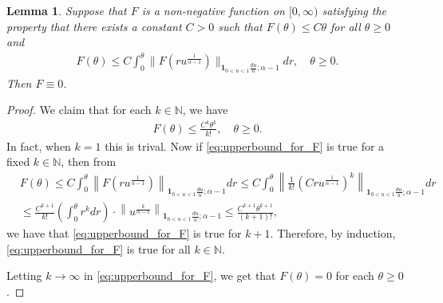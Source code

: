 \documentclass[12pt,a4paper]{amsart}
\newtheorem{lem}[thm]{Lemma}
\theoremstyle{definition}
\numberwithin{equation}{section}
\begin{document}
\begin{comment}
\begin{lem} \label{lem: characterize the general Mittag-Leffler distribution}
  Suppose that $\alpha \in (1,2).$
  The non-linear delay equation
  \begin{align} \label{eq: equation for the distribution}
    G( \theta)
    = \int_0^\theta \exp\Big\{ - \frac{\alpha} {\alpha - 1} \int_0^1 G(ru^{\frac{1}{\alpha - 1} })^{\alpha - 1}\frac{du}{u} \Big\} dr,
    \quad \theta \geq 0,
  \end{align}
	has a unique solution:
  \begin{align}\label{eq: solution for the equation}
    G(\theta)
    = \Big(\frac{1}{1+\theta^{-(\alpha - 1)}}\Big)^{\frac{1}{\alpha - 1}},
    \quad \theta \geq 0.
  \end{align}
\end{lem}
\end{comment}

\begin{lem}\label{lem: F is zero}
	Suppose that $F$ is a non-negative function on $[0,\infty)$ satisfying the property that there exists a constant $C>0$ such that  $F(\theta) \leq C\theta$ for all $\theta \geq 0$ and
  \begin{align}
    \label{eq:Gronwall_inequlity}
    F(\theta)
    \leq C \int_0^\theta \|  F(ru^{ \frac{1}{\alpha - 1}  })\|_{\mathbf 1_{0<u<1}\frac{du}{u}; \alpha - 1} dr, \quad \theta \geq 0.
  \end{align}
	Then $F \equiv 0$.
\end{lem}


\begin{proof}
  We claim that for each $k \in \mathbb N$, we have
  \begin{align}
    \label{eq:upperbound_for_F}
    F(\theta) \leq \frac{C^k \theta^k}{k!},
    \quad \theta \geq 0.
  \end{align}
  In fact, when $k = 1$ this is trival. Now if \eqref{eq:upperbound_for_F} is true for a fixed $k \in \mathbb N$, then from
  \begin{align}
    &F(\theta)
      \leq C \int_0^\theta \left\|  F\left(ru^{ \frac{1}{\alpha - 1}  }\right)\right\|_{\mathbf 1_{0<u<1}\frac{du}{u}; \alpha - 1} dr
      \leq C \int_0^\theta \left\|  \frac{1}{k!}\left(Cru^{ \frac{1}{\alpha - 1}  } \right)^k \right\|_{\mathbf 1_{0<u<1}\frac{du}{u}; \alpha - 1} dr
    \\ &\leq \frac{C^{k+1}}{k!} \left(\int_0^\theta r^k dr\right) \cdot \left\|u^{\frac{k}{\alpha - 1}} \right\|_{\mathbf 1_{0<u<1}\frac{du}{u}; \alpha - 1} \leq \frac{C^{k+1} \theta^{k+1}}{(k+1)!},
  \end{align}
  we have that \eqref{eq:upperbound_for_F} is true for $k+1$.
  Therefore, by induction, \eqref{eq:upperbound_for_F} is true for all $k \in \mathbb N$.

  Letting $k \to \infty$ in \eqref{eq:upperbound_for_F}, we get that $F(\theta) = 0$ for each $\theta \geq 0$.
\end{proof}
\end{document}
